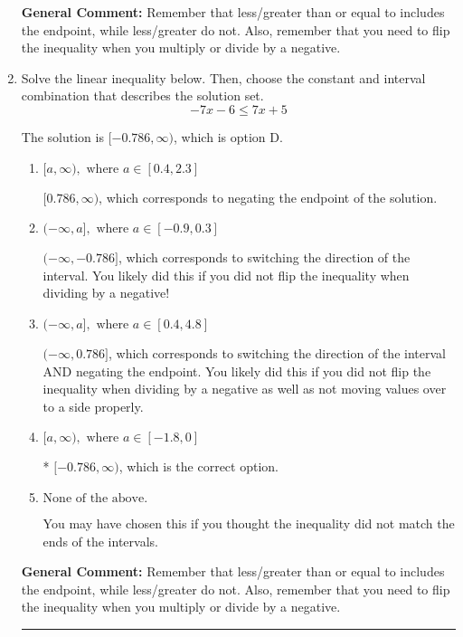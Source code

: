 \documentclass{extbook}[14pt]
\newcommand{\litem}[1]{\item #1

\rule{\textwidth}{0.4pt}}
\begin{document}
\begin{enumerate}
{\textbf{General Comment:} Remember that less/greater than or equal to includes the endpoint, while less/greater do not. Also, remember that you need to flip the inequality when you multiply or divide by a negative.
}
\litem{
Solve the linear inequality below. Then, choose the constant and interval combination that describes the solution set.
\[ -7x -6 \leq 7x + 5 \]

The solution is \( [-0.786, \infty) \), which is option D.\begin{enumerate}[label=\Alph*.]
\item \( [a, \infty), \text{ where } a \in [0.4, 2.3] \)

 $[0.786, \infty)$, which corresponds to negating the endpoint of the solution.
\item \( (-\infty, a], \text{ where } a \in [-0.9, 0.3] \)

 $(-\infty, -0.786]$, which corresponds to switching the direction of the interval. You likely did this if you did not flip the inequality when dividing by a negative!
\item \( (-\infty, a], \text{ where } a \in [0.4, 4.8] \)

 $(-\infty, 0.786]$, which corresponds to switching the direction of the interval AND negating the endpoint. You likely did this if you did not flip the inequality when dividing by a negative as well as not moving values over to a side properly.
\item \( [a, \infty), \text{ where } a \in [-1.8, 0] \)

* $[-0.786, \infty)$, which is the correct option.
\item \( \text{None of the above}. \)

You may have chosen this if you thought the inequality did not match the ends of the intervals.
\end{enumerate}

\textbf{General Comment:} Remember that less/greater than or equal to includes the endpoint, while less/greater do not. Also, remember that you need to flip the inequality when you multiply or divide by a negative.
}
\end{enumerate}
\end{document}
